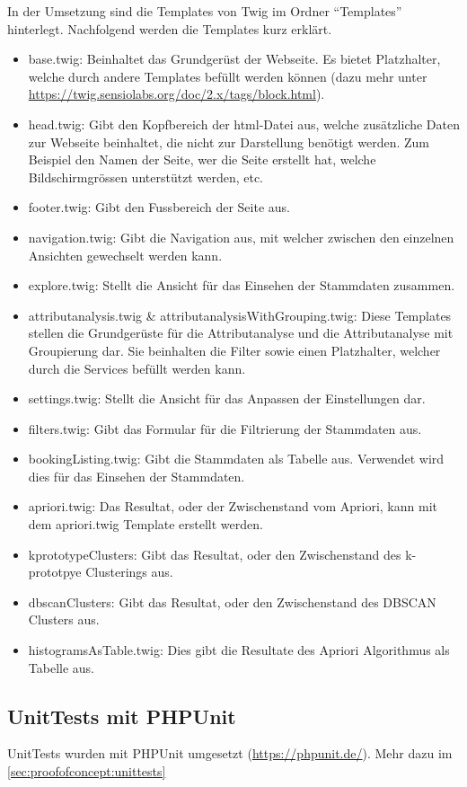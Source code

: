In der Umsetzung sind die Templates von Twig im Ordner "`Templates"' hinterlegt. Nachfolgend werden die Templates kurz erklärt.
\begin{itemize}
	\item base.twig: Beinhaltet das Grundgerüst der Webseite. Es bietet Platzhalter, welche durch andere Templates befüllt werden können (dazu mehr unter \url{https://twig.sensiolabs.org/doc/2.x/tags/block.html}).
	\item head.twig: Gibt den Kopfbereich der \gls{html}-Datei aus, welche zusätzliche Daten zur Webseite beinhaltet, die nicht zur Darstellung benötigt werden. Zum Beispiel den Namen der Seite, wer die Seite erstellt hat, welche Bildschirmgrössen unterstützt werden, etc.
	\item footer.twig: Gibt den Fussbereich der Seite aus. 
	\item navigation.twig: Gibt die Navigation aus, mit welcher zwischen den einzelnen Ansichten gewechselt werden kann.
	\item explore.twig: Stellt die Ansicht für das Einsehen der Stammdaten zusammen. 
	\item attributanalysis.twig \& attributanalysisWithGrouping.twig: Diese Templates stellen die Grundgerüste für die Attributanalyse und die Attributanalyse mit Groupierung dar. Sie beinhalten die Filter sowie einen Platzhalter, welcher durch die Services befüllt werden kann.
	\item settings.twig: Stellt die Ansicht für das Anpassen der Einstellungen dar. 
	\item filters.twig: Gibt das Formular für die Filtrierung der Stammdaten aus.
	\item bookingListing.twig: Gibt die Stammdaten als Tabelle aus. Verwendet wird dies für das Einsehen der Stammdaten.
	\item apriori.twig: Das Resultat, oder der Zwischenstand vom Apriori, kann mit dem apriori.twig Template erstellt werden.
	\item kprototypeClusters: Gibt das Resultat, oder den Zwischenstand des k-prototpye Clusterings aus.
	\item dbscanClusters: Gibt das Resultat, oder den Zwischenstand des DBSCAN Clusters aus.
	\item histogramsAsTable.twig: Dies gibt die Resultate des Apriori Algorithmus als Tabelle aus. 
\end{itemize}

\subsection{UnitTests mit PHPUnit}
\label{sec:proofofconcept:externebibliotheken:phpunit}
UnitTests wurden mit PHPUnit umgesetzt (\url{https://phpunit.de/}). Mehr dazu im \cref{sec:proofofconcept:unittests} 

